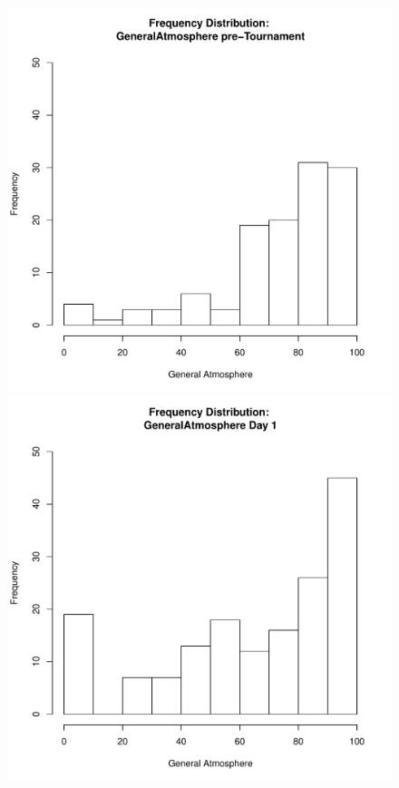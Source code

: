 \documentclass[12pt]{report}
\begin{document}
{%
\begin{figure}[htbp]
  \includegraphics[scale =.4]{../images/distGeneralAtmospherePre.pdf}
  \includegraphics[scale =.4]{../images/distGeneralAtmosphereDay1.pdf}

\end{figure}}
\end{document}
